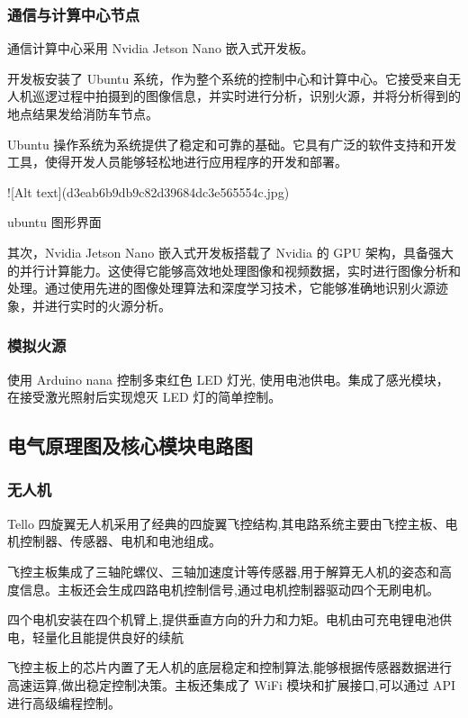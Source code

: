 \documentclass[12pt, a4paper, oneside]{article}
\begin{document}
\subsubsection{通信与计算中心节点}

通信计算中心采用 Nvidia Jetson Nano 嵌入式开发板。

开发板安装了 Ubuntu 系统，作为整个系统的控制中心和计算中心。它接受来自无人机巡逻过程中拍摄到的图像信息，并实时进行分析，识别火源，并将分析得到的地点结果发给消防车节点。

Ubuntu 操作系统为系统提供了稳定和可靠的基础。它具有广泛的软件支持和开发工具，使得开发人员能够轻松地进行应用程序的开发和部署。

![Alt text](d3eab6b9db9c82d39684dc3e565554c.jpg)

ubuntu 图形界面

其次，Nvidia Jetson Nano 嵌入式开发板搭载了 Nvidia 的 GPU 架构，具备强大的并行计算能力。这使得它能够高效地处理图像和视频数据，实时进行图像分析和处理。通过使用先进的图像处理算法和深度学习技术，它能够准确地识别火源迹象，并进行实时的火源分析。

\subsubsection{模拟火源}

使用 Arduino nana 控制多束红色 LED 灯光, 使用电池供电。集成了感光模块，在接受激光照射后实现熄灭 LED 灯的简单控制。

\subsection{电气原理图及核心模块电路图}

\subsubsection{无人机}


Tello 四旋翼无人机采用了经典的四旋翼飞控结构,其电路系统主要由飞控主板、电机控制器、传感器、电机和电池组成。

飞控主板集成了三轴陀螺仪、三轴加速度计等传感器,用于解算无人机的姿态和高度信息。主板还会生成四路电机控制信号,通过电机控制器驱动四个无刷电机。

四个电机安装在四个机臂上,提供垂直方向的升力和力矩。电机由可充电锂电池供电，轻量化且能提供良好的续航

飞控主板上的芯片内置了无人机的底层稳定和控制算法,能够根据传感器数据进行高速运算,做出稳定控制决策。主板还集成了 WiFi 模块和扩展接口,可以通过 API 进行高级编程控制。
\end{document}
